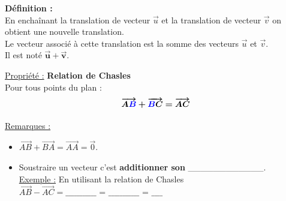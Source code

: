 \documentclass[12pt]{article}
\begin{document}
\vspace{10pt}

\begin{mdframed}[
    linewidth=1pt,
    roundcorner=5pt,
    linecolor=ForestGreen,
    innerbottommargin=10pt
]
{\color{ForestGreen}\textbf{Définition :}}
    \vspace{5pt}
    \\En enchaînant la translation de vecteur $\overrightarrow{u}$ et la translation de vecteur 
    $\overrightarrow{v}$ on obtient une nouvelle translation.
    \vspace{5pt}
    \\Le vecteur associé à cette translation est la somme des vecteurs $\overrightarrow{u}$ et 
    $\overrightarrow{v}$.
    \vspace{5pt}
    \\Il est noté $\bm{\overrightarrow{u} + \overrightarrow{v}}$.
\end{mdframed}

\begin{mdframed}[
    linewidth=1pt,
    roundcorner=5pt,
    linecolor=Red,
    innertopmargin=15pt,
]
{\color{red}
\underline{Propriété :} \textbf{Relation de Chasles}
\vspace{5pt}
\\Pour tous points du plan : 
\[
\bm{
\overrightarrow{A\color{blue}B} + \overrightarrow{{\color{blue}B}C} = \overrightarrow{AC}
}
\]
}
\end{mdframed}

\vspace{10pt}

\underline{Remarques :}
\vspace{5pt}
\begin{itemize}
    \item $\overrightarrow{AB} + \overrightarrow{BA} = \overrightarrow{AA} = \overrightarrow{0}$.
    \vspace{5pt}
    \item Soustraire un vecteur c'est \textbf{additionner son } \_\_\_\_\_\_\_\_\_\_\_\_.
    \vspace{5pt}
    \\\underline{Exemple :} En utilisant la relation de Chasles
    \vspace{10pt}
    \\$\overrightarrow{AB} - \overrightarrow{AC} = \_\_\_\_\_\_\_\_\_\_\_$ = $\_\_\_\_\_\_\_\_\_\_\_$ = $\_\_\_\_$
\end{itemize}
\end{document}
